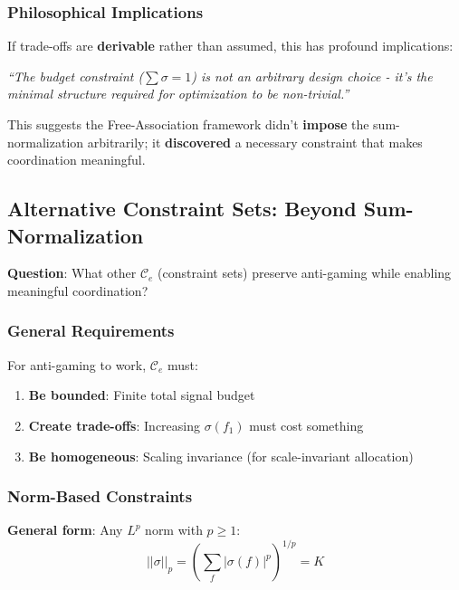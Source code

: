 \documentclass[11pt,a4paper]{article}
\theoremstyle{definition}
\theoremstyle{remark}
\begin{document}
\subsubsection{Philosophical Implications}

If trade-offs are \textbf{derivable} rather than assumed, this has profound implications:

\begin{center}
\textit{``The budget constraint ($\sum \sigma = 1$) is not an arbitrary design choice - it's the}\\
\textit{minimal structure required for optimization to be non-trivial.''}
\end{center}

This suggests the Free-Association framework didn't \textbf{impose} the sum-normalization arbitrarily; it \textbf{discovered} a necessary constraint that makes coordination meaningful.

\subsection{Alternative Constraint Sets: Beyond Sum-Normalization}
\label{sec:alternative-constraints}

\textbf{Question}: What other $\mathcal{C}_e$ (constraint sets) preserve anti-gaming while enabling meaningful coordination?

\subsubsection{General Requirements}

For anti-gaming to work, $\mathcal{C}_e$ must:
\begin{enumerate}
\item \textbf{Be bounded}: Finite total signal budget
\item \textbf{Create trade-offs}: Increasing $\sigma(f_1)$ must cost something
\item \textbf{Be homogeneous}: Scaling invariance (for scale-invariant allocation)
\end{enumerate}

\subsubsection{Norm-Based Constraints}

\textbf{General form}: Any $L^p$ norm with $p \ge 1$:
\[ ||\sigma||_p = \left(\sum_{f} |\sigma(f)|^p\right)^{1/p} = K \]
\end{document}

